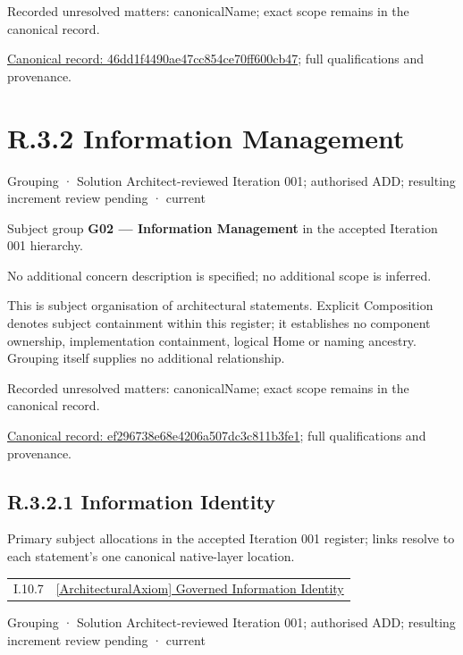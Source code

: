 {\small Recorded unresolved matters: canonicalName; exact scope remains in the canonical record.}\par
{\footnotesize \href{../../../../continuum/grouping/46dd1f4490ae47cc854ce70ff600cb47.md}{Canonical record: 46dd1f4490ae47cc854ce70ff600cb47}; full qualifications and provenance.}\par
\section*{R.3.2 Information Management}
\label{navigation:R.3.2}

\label{element:ef296738e68e4206a507dc3c811b3fe1}
{\small Grouping · Solution Architect-reviewed Iteration 001; authorised ADD; resulting increment review pending · current}\par

Subject group \textbf{G02 — Information Management} in the accepted Iteration 001 hierarchy.



No additional concern description is specified; no additional scope is inferred.



This is subject organisation of architectural statements. Explicit Composition denotes subject containment within this register; it establishes no component ownership, implementation containment, logical Home or naming ancestry. Grouping itself supplies no additional relationship.


{\small Recorded unresolved matters: canonicalName; exact scope remains in the canonical record.}\par
{\footnotesize \href{../../../../continuum/grouping/ef296738e68e4206a507dc3c811b3fe1.md}{Canonical record: ef296738e68e4206a507dc3c811b3fe1}; full qualifications and provenance.}\par
\subsection*{R.3.2.1 Information Identity}
\label{navigation:R.3.2.1}

Primary subject allocations in the accepted Iteration 001 register; links resolve to each statement’s one canonical native-layer location.\par
\begin{longtable}{p{.22\linewidth}p{.73\linewidth}}
I.10.7 & \hyperref[element:c2e7ee7597e64275b3523befd72c0987]{[ArchitecturalAxiom] Governed Information Identity} \\
\end{longtable}
\label{element:819aeed91d0544c3b7cc52e69aa46d72}
{\small Grouping · Solution Architect-reviewed Iteration 001; authorised ADD; resulting increment review pending · current}\par


